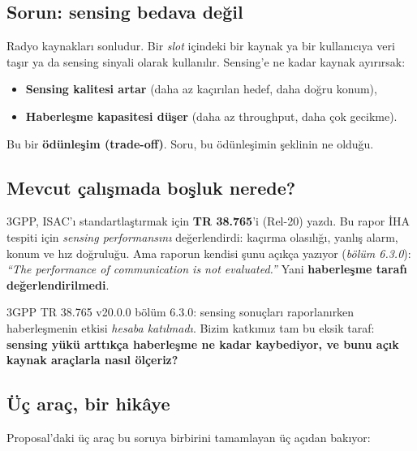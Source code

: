 \subsection{Sorun: sensing bedava değil}

Radyo kaynakları sonludur. Bir \emph{slot} içindeki bir kaynak ya bir kullanıcıya veri taşır ya da sensing sinyali olarak kullanılır.
Sensing'e ne kadar kaynak ayırırsak:
\begin{itemize}
\item \textcolor{good!70!black}{\textbf{Sensing kalitesi artar}} (daha az kaçırılan hedef, daha doğru konum),
\item \textcolor{bad!80!black}{\textbf{Haberleşme kapasitesi düşer}} (daha az throughput, daha çok gecikme).
\end{itemize}
Bu bir \textbf{ödünleşim (trade-off)}. Soru, bu ödünleşimin şeklinin ne olduğu.

\subsection{Mevcut çalışmada boşluk nerede?}

3GPP, ISAC'ı standartlaştırmak için \textbf{TR 38.765}'i (Rel-20) yazdı. Bu rapor İHA tespiti için \emph{sensing performansını} değerlendirdi:
kaçırma olasılığı, yanlış alarm, konum ve hız doğruluğu. Ama raporun kendisi şunu açıkça yazıyor
(\emph{bölüm 6.3.0}): \textit{``The performance of communication is not evaluated.''} Yani \textbf{haberleşme tarafı değerlendirilmedi}.

\begin{bulgu}
3GPP TR 38.765 v20.0.0 bölüm 6.3.0: sensing sonuçları raporlanırken haberleşmenin etkisi \emph{hesaba katılmadı}.
Bizim katkımız tam bu eksik taraf: \textbf{sensing yükü arttıkça haberleşme ne kadar kaybediyor, ve bunu açık kaynak araçlarla nasıl ölçeriz?}
\end{bulgu}

\subsection{Üç araç, bir hikâye}

Proposal'daki üç araç bu soruya birbirini tamamlayan üç açıdan bakıyor:

